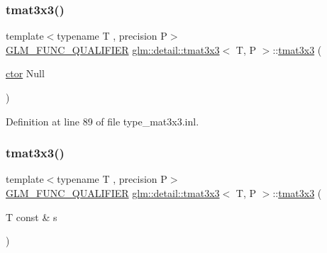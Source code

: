 \mbox{\label{structglm_1_1detail_1_1tmat3x3_ac542e26b78b276165616b75632e45f4b}} 
\subsubsection{\texorpdfstring{tmat3x3()}{tmat3x3()}\hspace{0.1cm}{\footnotesize\ttfamily [4/22]}}
{\footnotesize\ttfamily template$<$typename T , precision P$>$ \\
\hyperlink{setup_8hpp_a33fdea6f91c5f834105f7415e2a64407}{G\+L\+M\+\_\+\+F\+U\+N\+C\+\_\+\+Q\+U\+A\+L\+I\+F\+I\+ER} \hyperlink{structglm_1_1detail_1_1tmat3x3}{glm\+::detail\+::tmat3x3}$<$ T, P $>$\+::\hyperlink{structglm_1_1detail_1_1tmat3x3}{tmat3x3} (\begin{DoxyParamCaption}\item[{\hyperlink{structglm_1_1detail_1_1tmat3x3_a24175afa829b47d3cc2a65860b16e103}{ctor}}]{Null }\end{DoxyParamCaption})\hspace{0.3cm}{\ttfamily [explicit]}}



Definition at line 89 of file type\+\_\+mat3x3.\+inl.

\mbox{\label{structglm_1_1detail_1_1tmat3x3_a4c126cf2520005853e4ce6e4689906c6}} 
\subsubsection{\texorpdfstring{tmat3x3()}{tmat3x3()}\hspace{0.1cm}{\footnotesize\ttfamily [5/22]}}
{\footnotesize\ttfamily template$<$typename T , precision P$>$ \\
\hyperlink{setup_8hpp_a33fdea6f91c5f834105f7415e2a64407}{G\+L\+M\+\_\+\+F\+U\+N\+C\+\_\+\+Q\+U\+A\+L\+I\+F\+I\+ER} \hyperlink{structglm_1_1detail_1_1tmat3x3}{glm\+::detail\+::tmat3x3}$<$ T, P $>$\+::\hyperlink{structglm_1_1detail_1_1tmat3x3}{tmat3x3} (\begin{DoxyParamCaption}\item[{T const \&}]{s }\end{DoxyParamCaption})\hspace{0.3cm}{\ttfamily [explicit]}}



